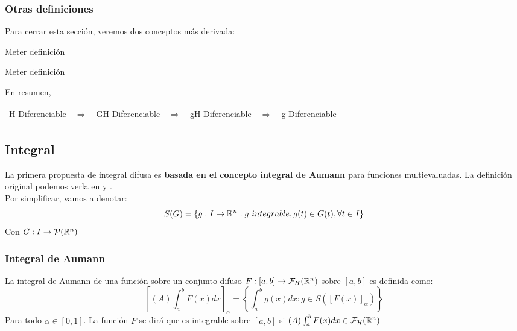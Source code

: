 \subsubsection{Otras definiciones}

Para cerrar esta sección, veremos dos conceptos más derivada:

\begin{definicion}
  Meter definición
\end{definicion}

\begin{definicion}
  \label{def:diferencial_generalizada}
  Meter definición
\end{definicion}

En resumen,
\begin{table}[h]
  \centering
  \begin{tabular}{lllllll}
    H-Diferenciable & $\Rightarrow$ & GH-Diferenciable & $\Rightarrow$ & gH-Diferenciable & $\Rightarrow$ & g-Diferenciable
  \end{tabular}
\end{table}

\subsection{Integral}
La primera propuesta de integral difusa es \textbf{basada en el concepto integral de Aumann \cite{aumannintegral}} para funciones multievaluadas. La definición original podemos verla en \cite{integral1} y \cite{integral2}. \\
Por simplificar, vamos a denotar:
\[
S(G) = \{g : I \rightarrow \mathbb R^n : g ~ integrable, g(t) \in G(t), \forall t \in I \}
\]
Con $G : I \rightarrow \mathcal{P}(\mathbb R^n)$

\subsubsection{Integral de Aumann}
\begin{definicion}
  La integral de Aumann de una función sobre un conjunto difuso $F : [a, b] \rightarrow \mathcal{F}_H(\mathbb R^n)$ sobre $[a, b]$ es definida como: 
  \[
  \left[
    (A) \int_{a}^{b} F(x) dx
    \right]_\alpha = \left\{
  \int_{a}^{b} g(x) dx : g \in S([F(x)]_\alpha)
  \right\}
  \]
  Para todo $\alpha \in [0, 1]$. La función $F$ se dirá que es integrable sobre $[a, b]$ si $(A) \int_{a}^{b} F(x) dx \in \mathcal{F}_\mathcal{H}(\mathbb R^n)$
\end{definicion}

